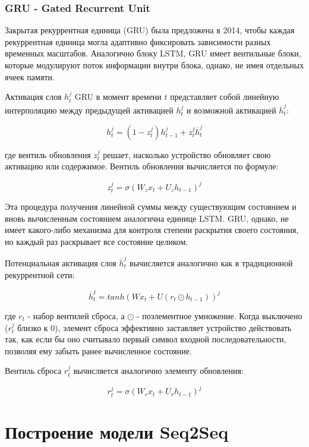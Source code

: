 \documentclass[a4paper,russian]{article}
\begin{document}
	\clearpage
	
	\subsubsection{GRU - Gated Recurrent Unit}
	
	Закрытая рекуррентная единица (GRU) была предложена в 2014, чтобы каждая рекуррентная единица
	могла адаптивно фиксировать зависимости разных временных масштабов. Аналогично блоку LSTM, GRU имеет
	вентильные блоки, которые модулируют поток информации внутри блока, однако, не имея отдельных
	ячеек памяти.
	
	Активация слоя $h^{j}_{t}$ GRU в момент времени $t$ представляет собой линейную интерполяцию между предыдущей активацией $h^{j}_{t}$ и возможной активацией $\overline{h}^{j}_{t}$:
	
	$$ h^{j}_{t} = (1 - z^{j}_{t})h^{j}_{t - 1} + z^{j}_{t} \overline{h}^{j}_{t} $$
	
	где вентиль обновления $z^{j}_{t}$ решает, насколько устройство обновляет свою активацию или содержимое. Вентиль обновления вычисляется по формуле:
	
 	$$ z^{j}_{t} = \sigma(W_z x_t + U_z h_{t - 1})^j $$

	Эта процедура получения линейной суммы между существующим состоянием и вновь вычисленным состоянием аналогична единице LSTM. GRU, однако, не имеет какого-либо механизма для контроля степени раскрытия своего состояния, но каждый раз раскрывает все состояние целиком.
	
	Потенциальная активация слоя $\overline{h}^{j}_{t}$ вычисляется аналогично как в традиционной рекуррентной сети:
	
	$$ \overline{h}^{j}_{t} = tanh(W x_t + U(r_t \odot h_{t - 1}))^j $$
	
	где $r_t$ - набор вентилей сброса, а $\odot$ - поэлементное умножение. Когда выключено ($r^{j}_{t}$ близко к 0), элемент сброса эффективно заставляет устройство действовать так, как если бы оно считывало первый символ входной последовательности, позволяя ему забыть ранее вычисленное состояние.
	
	Вентиль сброса $r^{j}_{t}$ вычисляется аналогично элементу обновления:
	
	$$ r^{j}_{t} = \sigma(W_r x_t + U_r h_{t - 1})^j $$
	
 	\clearpage
	
	\section{Построение модели Seq2Seq}
\end{document}
